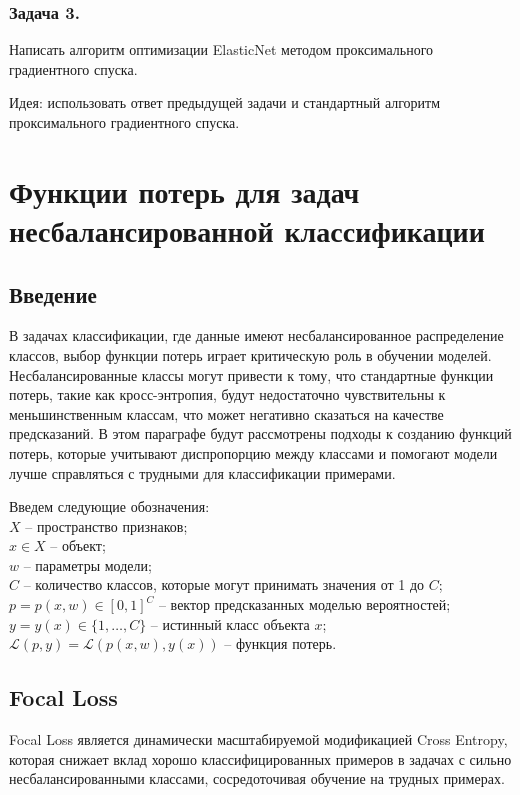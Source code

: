 \subsubsection*{Задача 3.}

Написать алгоритм оптимизации ElasticNet методом проксимального градиентного спуска.

Идея: использовать ответ предыдущей задачи и стандартный алгоритм проксимального градиентного спуска.


\section*{Функции потерь для задач несбалансированной классификации}

\subsection*{Введение}

В задачах классификации, где данные имеют несбалансированное распределение классов, выбор функции потерь играет критическую роль в обучении моделей. Несбалансированные классы могут привести к тому, что стандартные функции потерь, такие как кросс-энтропия, будут недостаточно чувствительны к меньшинственным классам, что может негативно сказаться на качестве предсказаний. В этом параграфе будут рассмотрены подходы к созданию функций потерь, которые учитывают диспропорцию между классами и помогают модели лучше справляться с трудными для классификации примерами.

Введем следующие обозначения:
\\\indent $X$ -- пространство признаков;
\\\indent $x \in X$ -- объект;
\\\indent $w$ -- параметры модели;
\\\indent $C$ -- количество классов, которые могут принимать значения от 1 до $C$;
\\\indent $p=p(x,w) \in [0, 1]^C$ -- вектор предсказанных моделью вероятностей;
\\\indent $y=y(x) \in \{1,\ldots,C\}$ -- истинный класс объекта $x$;
\\\indent $\mathcal{L}(p,y) = \mathcal{L}(p(x, w), y(x))$ -- функция потерь.

\subsection*{Focal Loss}

Focal Loss является динамически масштабируемой модификацией Cross Entropy, которая снижает вклад хорошо классифицированных примеров в задачах с сильно несбалансированными классами, сосредоточивая обучение на трудных примерах.

